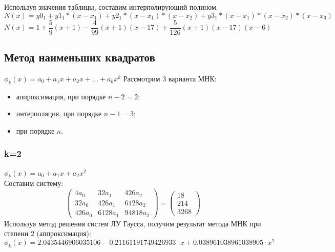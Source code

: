 \documentclass{article}
\begin{document}
Используя значения таблицы, составим интерполирующий полином.
\begin{displaymath} 
  N(x) = y0_1 + y1_{1} *(x-x_1) + y2_1 *(x-x_1)*(x-x_2) +
  y3_1*(x-x_1)*(x-x_2)*(x-x_3) 
\end{displaymath}
\begin{displaymath} 
  N(x) = 1 + \frac{5}{9}(x+1) - \frac{4}{99}(x+1)(x-17) +
  \frac{5}{126}(x+1)(x-17)(x-6)
\end{displaymath}


\subsection{Метод наименьших квадратов}
$\phi_k(x) = a_0 + a_1x + a_2x + \ldots + a_kx^k$
Рассмотрим 3 варианта МНК:
\begin{itemize}
  \item аппроксимация, при порядке $n-2 = 2$;
  \item интерполяция, при порядке $n-1 = 3$;
  \item при порядке $n$.
\end{itemize}

\subsubsection{k=2}
$\phi_k(x) = a_0 + a_1x + a_2x^2$\\
Составим систему:
\begin{displaymath}
\left(
  \begin{array}{ccc}
    4 a_{0} & 32 a_{1} & 426 a_{2} \\
    32 a_{0} & 426 a_{1} & 6128 a_{2} \\
    426 a_{0} & 6128 a_{1} & 94818 a_{2} 
  \end{array}
\right)
=
\left(
  \begin{array}{ccc}
    18\\
    214\\
    3268
  \end{array}
\right)
\end{displaymath}
Используя метод решения систем ЛУ Гаусса, получим результат метода МНК при
степени 2 (аппроксимация):
\begin{displaymath}
\phi_k(x) = 
  2.0435446906035106 -
  0.21161191749426933 \cdot x +
  0.038961038961038905 \cdot x^2
\end{displaymath}
\end{document}
